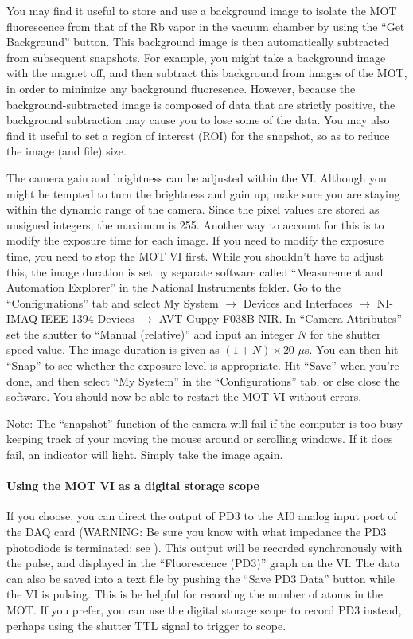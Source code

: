 \documentclass{../lab}
\begin{document}
You may find it useful to store and use a background image to isolate the MOT fluorescence from that of the Rb vapor in the vacuum chamber by using the ``Get Background'' button. This background image is then automatically subtracted from subsequent snapshots. For example, you might take a background image with the magnet off, and then subtract this background from images of the MOT, in order to minimize any background fluoresence. However, because the background-subtracted image is composed of data that are strictly positive, the background subtraction may cause you to lose some of the data. You may also find it useful to set a region of interest (ROI) for the snapshot, so as to reduce the image (and file) size.

The camera gain and brightness can be adjusted within the VI. Although you might be tempted to turn the brightness and gain up, make sure you are staying within the dynamic range of the camera. Since the pixel values are stored as unsigned integers, the maximum is 255. Another way to account for this is to modify the exposure time for each image. If you need to modify the exposure time, you need to stop the MOT VI first. While you shouldn't have to adjust this, the image duration is set by separate software called ``Measurement and Automation Explorer'' in the National Instruments folder. Go to the ``Configurations'' tab and select My System $\rightarrow$ Devices and Interfaces $\rightarrow$ NI-IMAQ IEEE 1394 Devices $\rightarrow$ AVT Guppy F038B NIR. In ``Camera Attributes'' set the shutter to ``Manual (relative)'' and input an integer $N$ for the shutter speed value. The image duration is given as $(1+N) \times 20$  $\mu$s. You can then hit ``Snap'' to see whether the exposure level is appropriate. Hit ``Save'' when you're done, and then select ``My System'' in the ``Configurations'' tab, or else close the software. You should now be able to restart the MOT VI without errors.

Note: The ``snapshot'' function of the camera will fail if the computer is too busy keeping track of your moving the mouse around or scrolling windows. If it does fail, an indicator will light. Simply take the image again.

\paragraph{Using the MOT VI as a digital storage scope}

If you choose, you can direct the output of PD3 to the AI0 analog input port of the DAQ card (WARNING: Be sure you know with what impedance the PD3 photodiode is terminated; see ). This output will be recorded synchronously with the pulse, and displayed in the ``Fluorescence (PD3)'' graph on the VI. The data can also be saved into a text file by pushing the ``Save PD3 Data'' button while the VI is pulsing. This is be helpful for recording the number of atoms in the MOT. If you prefer, you can use the digital storage scope to record PD3 instead, perhaps using the shutter TTL signal to trigger to scope.
\end{document}

